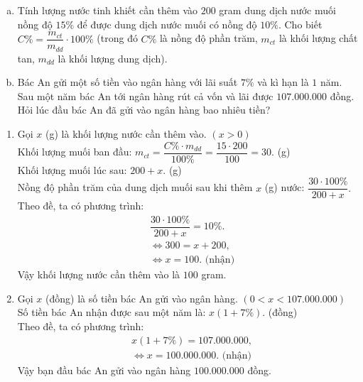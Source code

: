 \begin{ex}%
	\begin{enumerate}[a)] 
		\item Tính lượng nước tinh khiết cần thêm vào $200$ gram dung dịch nước muối nồng độ $15\%$ để được dung dịch nước muối có nồng độ $10\%$. Cho biết $C\%=\dfrac{m_{ct}}{m_{dd}}\cdot{100\%}$ (trong đó $C\%$ là nồng độ phần trăm, $m_{ct}$ là khối lượng chất tan, $m_{dd}$ là khối lượng dung dịch).
		\item Bác An gửi một số tiền vào ngân hàng với lãi suất $7\%$ và kì hạn là $1$ năm. Sau một năm bác An tới ngân hàng rút cả vốn và lãi được $107.000.000$ đồng. Hỏi lúc đầu bác An đã gửi vào ngân hàng bao nhiêu tiền? 
	\end{enumerate}
	\loigiai
	{
		\begin{enumerate}
			\item Gọi $x$ (g) là khối lượng nước cần thêm vào. $(x>0)$\\
			Khối lượng muối ban đầu: $m_{ct}=\dfrac{C\%\cdot m_{dd}}{100\%}=\dfrac{15\cdot200}{100}=30.$ (g)\\
			Khối lượng muối lúc sau: $200+x.$  (g)\\
			Nồng độ phần trăm của dung dịch muối sau khi thêm $x$ (g) nước: $\dfrac{30\cdot100\%}{200+x}.$\\
			Theo đề, ta có phương trình:
			\begin{align*}
			&\dfrac{30\cdot100\%}{200+x}=10\%.\\
			&\Leftrightarrow 300=x+200,\\
			&\Leftrightarrow x=100. \text{ (nhận)}
			\end{align*}
			Vậy khối lượng nước cần thêm vào là $100$ gram.
			\item Gọi $x$ (đồng) là số tiền bác An gửi vào ngân hàng. $(0<x<107.000.000)$\\
			Số tiền bác An nhận được sau một năm là: $x(1+7\%)$. (đồng)\\
			Theo đề, ta có phương trình:
			\begin{align*}
			&x(1+7\%)=107.000.000,\\
			&\Leftrightarrow x=100.000.000. \text{  (nhận)}
			\end{align*}
			Vậy bạn đầu bác An gửi vào ngân hàng $100.000.000$ đồng.
		\end{enumerate}
	}
\end{ex}
